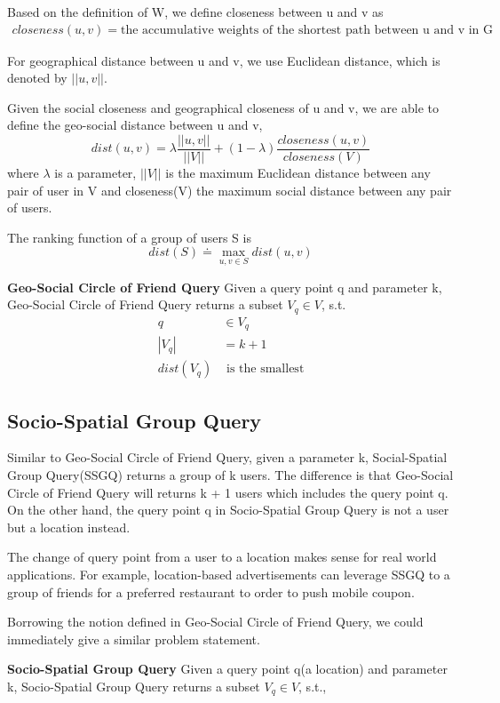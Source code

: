 Based on the definition of W, we define closeness between u and v as
\begin{align*}
closeness(u,v) = \mbox{the accumulative weights of the shortest path between u and v in G} 
\end{align*}

For geographical distance between u and v, we use Euclidean distance, which is denoted by $||u,v||$.

Given the social closeness and geographical closeness of u and v, we are able to define the geo-social distance between u and v, 
$$
dist(u,v) = \lambda \frac{||u,v||}{||V||} + (1 - \lambda) \frac{closeness(u,v)}{closeness(V)}
$$
where $\lambda$ is a parameter, $||V||$ is the maximum Euclidean distance between any pair of user in V and closeness(V) the maximum social distance between any pair of users. 

The ranking function of a group of users S is 
$$
dist(S) \doteq \max_{u,v \in S} dist(u,v)
$$

\textbf{Geo-Social Circle of Friend Query} Given a query point q and parameter k, Geo-Social Circle of Friend Query returns a subset $V_q \in V$, s.t.
\begin{align}
q & \in V_q \\
|V_q| & = k + 1 \\
dist(V_q) & \mbox{ is the smallest}
\end{align}

\subsection{Socio-Spatial Group Query}
Similar to Geo-Social Circle of Friend Query, given a parameter k, Social-Spatial Group Query(SSGQ) \cite{Yang} returns a group of k users. The difference is that Geo-Social Circle of Friend Query will returns k + 1 users which includes the query point q. On the other hand, the query point q in Socio-Spatial Group Query is not a user but a location instead.

The change of query point from a user to a location makes sense for real world applications. For example, location-based advertisements can leverage SSGQ to a group of friends for a preferred restaurant to order to push mobile coupon. 

Borrowing the notion defined in Geo-Social Circle of Friend Query, we could immediately give a similar problem statement. 

\textbf{Socio-Spatial Group Query} 
Given a query point q(a location) and parameter k, Socio-Spatial Group Query returns a subset $V_q \in V$, s.t., 

